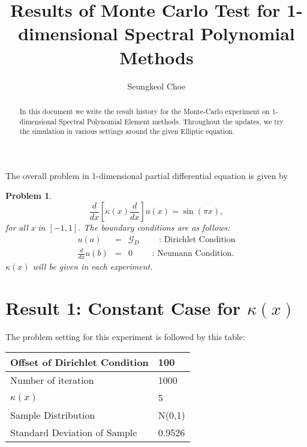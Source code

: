 \documentclass[11pt,letterpaper]{article}
\newtheorem{problem}[define]{Problem}
\begin{document}
\title{{\bfseries Results of  Monte Carlo Test for 1-dimensional Spectral Polynomial Methods}}

\author{Seungkeol Choe}
\renewcommand{\today}{Feb 12th, 2004}

\maketitle

\begin{abstract}
In this document we write the result history for the Monte-Carlo experiment on 
1-dimensional Spectral Polynomial Element methods. Throughout the updates, we try the simulation in various settings around the given Elliptic equation. 
\end{abstract}




The overall problem in 1-dimensional partial differential equation is given by
\begin{problem}
\begin{equation*}
     \frac{d}{dx}\left[ \kappa(x)\frac{d}{dx}\right] u(x) = \sin(\pi x),
\end{equation*}
for all x in $[-1, 1]$.
The boundary conditions are as follows:
\begin{eqnarray}\label{bdycond}
    u(a) &=& {\mathcal G}_D \qquad \mbox{ : Dirichlet Condition}\\
    \frac{d}{dx}u(b) &=& 0\qquad \mbox{ : Neumann Condition}.
\end{eqnarray}
$\kappa(x)$ will be given in each experiment.
\end{problem}

\section {Result 1: Constant Case for $\kappa(x)$}

The problem setting for this experiment is followed by this table:
\begin{table}[h]
\begin{center}
\begin{tabular}{|l|l|} \hline
Offset of Dirichlet Condition& 100 \\ \hline
Number of iteration& 1000 \\ \hline
$\kappa(x) $& 5 \\ \hline
Sample Distribution& N(0,1) \\ \hline
Standard Deviation of Sample & 0.9526 \\ \hline
\end{tabular}
\end{center}
\end{table}
\end{document}
